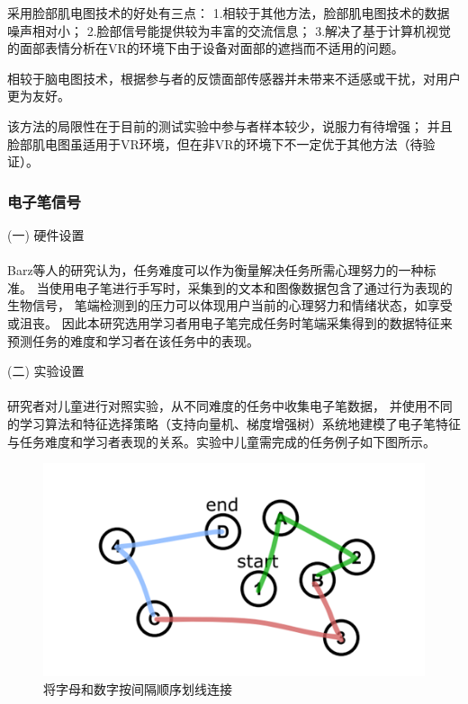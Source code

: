 \documentclass{article}
\begin{document}
            采用脸部肌电图技术的好处有三点：
            1.相较于其他方法，脸部肌电图技术的数据噪声相对小；
            2.脸部信号能提供较为丰富的交流信息；
            3.解决了基于计算机视觉的面部表情分析在VR的环境下由于设备对面部的遮挡而不适用的问题。

            相较于脑电图技术，根据参与者的反馈面部传感器并未带来不适感或干扰，对用户更为友好。

            该方法的局限性在于目前的测试实验中参与者样本较少，说服力有待增强；
            并且脸部肌电图虽适用于VR环境，但在非VR的环境下不一定优于其他方法（待验证）。

            \subsubsection{电子笔信号}
            (一) 硬件设置\paragraph{}
            Barz等人\cite{ref10}的研究认为，任务难度可以作为衡量解决任务所需心理努力的一种标准。
            当使用电子笔进行手写时，采集到的文本和图像数据包含了通过行为表现的生物信号，
            笔端检测到的压力可以体现用户当前的心理努力和情绪状态，如享受或沮丧。
            因此本研究选用学习者用电子笔完成任务时笔端采集得到的数据特征来预测任务的难度和学习者在该任务中的表现。

            (二) 实验设置\paragraph{}
            研究者对儿童进行对照实验，从不同难度的任务中收集电子笔数据，
            并使用不同的学习算法和特征选择策略（支持向量机、梯度增强树）系统地建模了电子笔特征与任务难度和学习者表现的关系。实验中儿童需完成的任务例子如下图所示。

            \begin{figure}[H]
            	
            	\centering
            	\includegraphics[scale=0.5]{images/digital_pen.png}
            	\caption{将字母和数字按间隔顺序划线连接}
            	\label{fig:label}
            \end{figure}
\end{document}
